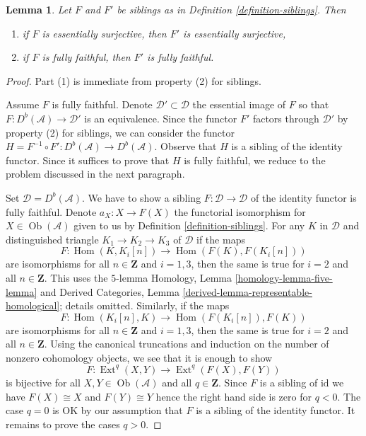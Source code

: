 \documentclass{stacks-project}
\theoremstyle{plain}
\newtheorem{lemma}[subsection]{Lemma}
\theoremstyle{definition}
\theoremstyle{remark}
\numberwithin{equation}{subsection}
\def\Hom{\mathop{\mathrm{Hom}}\nolimits}
\def\Ext{\mathop{\mathrm{Ext}}\nolimits}
\def\Ob{\mathop{\mathrm{Ob}}\nolimits}
\begin{document}
\begin{lemma}
\label{lemma-sibling-faithful}
Let $F$ and $F'$ be siblings as in Definition \ref{definition-siblings}.
Then
\begin{enumerate}
\item if $F$ is essentially surjective, then $F'$ is essentially
surjective,
\item if $F$ is fully faithful, then $F'$ is fully faithful.
\end{enumerate}
\end{lemma}

\begin{proof}
Part (1) is immediate from property (2) for siblings.

\medskip\noindent
Assume $F$ is fully faithful. Denote $\mathcal{D}' \subset \mathcal{D}$
the essential image of $F$ so that $F : D^b(\mathcal{A}) \to \mathcal{D}'$
is an equivalence. Since the functor $F'$ factors through $\mathcal{D}'$
by property (2) for siblings, we can consider the functor
$H = F^{-1} \circ F' : D^b(\mathcal{A}) \to D^b(\mathcal{A})$.
Observe that $H$ is a sibling of the identity functor.
Since it suffices to prove that $H$ is fully faithful,
we reduce to the problem discussed in the next paragraph.

\medskip\noindent
Set $\mathcal{D} = D^b(\mathcal{A})$. We have to show a sibling
$F : \mathcal{D} \to \mathcal{D}$ of the identity functor is fully faithful.
Denote $a_X : X \to F(X)$ the functorial isomorphism for
$X \in \Ob(\mathcal{A})$ given to us by Definition \ref{definition-siblings}.
For any $K$ in $\mathcal{D}$ and distinguished triangle
$K_1 \to K_2 \to K_3$ of $\mathcal{D}$
if the maps
$$
F : \Hom(K, K_i[n]) \to \Hom(F(K), F(K_i[n]))
$$
are isomorphisms for all $n \in \mathbf{Z}$ and $i = 1, 3$, then the
same is true for $i = 2$ and all $n \in \mathbf{Z}$. This uses the
$5$-lemma Homology, Lemma \ref{homology-lemma-five-lemma} and
Derived Categories, Lemma \ref{derived-lemma-representable-homological};
details omitted. Similarly, if the maps
$$
F : \Hom(K_i[n], K) \to \Hom(F(K_i[n]), F(K))
$$
are isomorphisms for all $n \in \mathbf{Z}$ and $i = 1, 3$, then the
same is true for $i = 2$ and all $n \in \mathbf{Z}$. Using the canonical
truncations and induction on the number of nonzero cohomology objects,
we see that it is enough to show
$$
F : \Ext^q(X, Y) \to \Ext^q(F(X), F(Y))
$$
is bijective for all $X, Y \in \Ob(\mathcal{A})$ and all $q \in \mathbf{Z}$.
Since $F$ is a sibling of $\text{id}$ we have $F(X) \cong X$ and
$F(Y) \cong Y$ hence the right hand side is zero for $q < 0$.
The case $q = 0$ is OK by our assumption that $F$ is a sibling of
the identity functor. It remains to prove the cases $q > 0$.


\end{proof}
\end{document}
